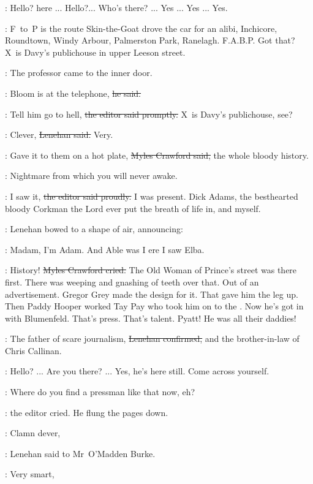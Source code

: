 \machugh:
Hello?
 here ...
Hello?...
Who's there? ...
Yes ...
Yes ...
Yes.

\crawford:
F~to~P is the route Skin-the-Goat drove the car for an alibi,
Inchicore, Roundtown, Windy Arbour, Palmerston Park, Ranelagh.
F.A.B.P.
Got that?
X~is Davy's publichouse in upper Leeson street.

:
The professor came to the inner door.

\machugh:
Bloom is at the telephone,
\sout{he said.}

\crawford:
Tell him go to hell,
\sout{the editor said promptly.}
X~is Davy's publichouse,
see?



\lenehan:
Clever,
\sout{Lenehan said.}
Very.

\crawford:
Gave it to them on a hot plate,
\sout{Myles Crawford said,}
the whole bloody history.

\StephenInt:
Nightmare from which you will never awake.

\crawford:
I saw it,
\sout{the editor said proudly.}
I was present.
Dick Adams, the besthearted bloody Corkman
the Lord ever put the breath of life in,
and myself.

:
Lenehan bowed to a shape of air,
announcing:

\lenehan:
Madam,
I'm Adam.
And Able was I ere I saw Elba.

\crawford:
History!
\sout{Myles Crawford cried.}
The Old Woman of Prince's street was there first.
There was weeping and gnashing of teeth over that.
Out of an advertisement.
Gregor Grey made the design for it.
That gave him the leg up.
Then Paddy Hooper worked Tay Pay who took him on to the .
Now he's got in with Blumenfeld.
That's press.
That's talent.
Pyatt!
He was all their daddies!

\lenehan:
The father of scare journalism,
\sout{Lenehan confirmed,}
and the brother-in-law of Chris Callinan.

\machugh:
Hello? ...
Are you there? ...
Yes, he's here still.
Come across yourself.

\crawford:
Where do you find a pressman like that now, eh?

:
the editor cried.
He flung the pages down.

\lenehan:
Clamn dever,

:
Lenehan said to Mr~O'Madden Burke.

\omaddenburke:
Very smart,


